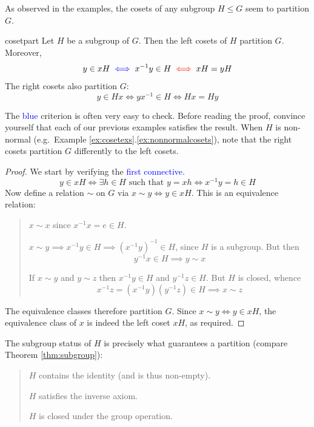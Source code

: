 \goodbreak

As observed in the examples, the cosets of any subgroup $H\le G$ seem to partition $G$.

\begin{thm}{}{cosetpart}
	Let $H$ be a subgroup of $G$. Then the left cosets of $H$ partition $G$. Moreover,
	\[
		y\in xH
		\mathrel{\textcolor{blue}{\iff}} x^{-1}y\in H
		\mathrel{\textcolor{red}{\iff}} xH=yH
	\]
	The right cosets also partition $G$:
	\[
		y\in Hx\iff yx^{-1}\in H\iff Hx=Hy
	\]
\end{thm}

The \textcolor{blue}{blue} criterion is often very easy to check. Before reading the proof, convince yourself that each of our previous examples satisfies the result. When $H$ is non-normal  (e.g.\ Example \ref*{ex:cosetexs}.\ref{ex:nonnormalcosets}), note that the right cosets partition $G$ differently to the left cosets.

\begin{proof}
	We start by verifying the \textcolor{blue}{first connective}.
	\[
		y\in xH
		\iff \exists h\in H\text{ such that }y=xh
		\iff x^{-1}y=h\in H
	\]
	Now define a relation $\sim$ on $G$ via $x\sim y\Longleftrightarrow y\in xH$. This is an equivalence relation:
	\begin{quote}
		\begin{description}\itemsep2pt
			\item[\normalfont\emph{Reflexivity}:] $x\sim x$ since $x^{-1}x=e\in H$.
			\item[\normalfont\emph{Symmetry}:] $x\sim y\implies x^{-1}y\in H\implies (x^{-1}y)^{-1}\in H$, since $H$ is a subgroup. But then
			\[
				y^{-1}x\in H\implies y\sim x
			\]
			\item[\normalfont\emph{Transitivity}:] If $x\sim y$ and $y\sim z$ then $x^{-1}y\in H$ and $y^{-1}z\in H$. But $H$ is closed, whence
			\[
				x^{-1}z=(x^{-1}y)(y^{-1}z)\in H\implies x\sim z
			\]
		\end{description}
	\end{quote}
	The equivalence classes therefore partition $G$. Since $x\sim y\iff y\in xH$, the equivalence class of $x$ is indeed the left coset $xH$, as required.\qedhere
\end{proof}



The subgroup status of $H$ is precisely what guarantees a partition (compare Theorem \ref{thm:subgroup}):
\begin{quote}
	\begin{description}\itemsep2pt
		\item[\normalfont\emph{Reflexivity}:]  $H$ contains the identity (and is thus non-empty).
		\item[\normalfont\emph{Symmetry}:] $H$ satisfies the inverse axiom.
		\item[\normalfont\emph{Transitivity}:] $H$ is closed under the group operation.
	\end{description}
\end{quote}

